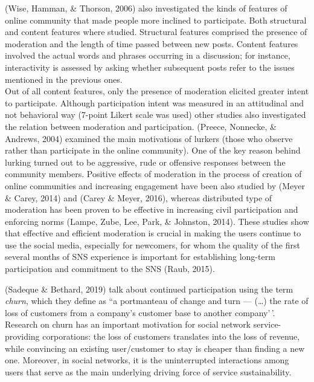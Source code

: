 \documentclass[
  10pt,
  dvipsnames]{scrartcl}
\begin{document}
(Wise, Hamman, \& Thorson, 2006) also investigated the kinds of features
of online community that made people more inclined to participate. Both
structural and content features where studied. Structural features
comprised the presence of moderation and the length of time passed
between new posts. Content features involved the actual words and
phrases occurring in a discussion; for instance, interactivity is
assessed by asking whether subsequent posts refer to the issues
mentioned in the previous ones.\\
Out of all content features, only the presence of moderation elicited
greater intent to participate. Although participation intent was
measured in an attitudinal and not behavioral way (7-point Likert scale
was used) other studies also investigated the relation between
moderation and participation. (Preece, Nonnecke, \& Andrews, 2004)
examined the main motivations of lurkers (those who observe rather than
participate in the online community). One of the key reason behind
lurking turned out to be aggressive, rude or offensive responses between
the community members. Positive effects of moderation in the process of
creation of online communities and increasing engagement have been also
studied by (Meyer \& Carey, 2014) and (Carey \& Meyer, 2016), whereas
distributed type of moderation has been proven to be effective in
increasing civil participation and enforcing norms (Lampe, Zube, Lee,
Park, \& Johnston, 2014). These studies show that effective and
efficient moderation is crucial in making the users continue to use the
social media, especially for newcomers, for whom the quality of the
first several months of SNS experience is important for establishing
long-term participation and commitment to the SNS (Raub, 2015).

(Sadeque \& Bethard, 2019) talk about continued participation using the
term \textit{churn}, which they define as ``a portmanteau of change and
turn --- (\dots) the rate of loss of customers from a company's customer
base to another company'\,'. Research on churn has an important
motivation for social network service-providing corporations: the loss
of customers translates into the loss of revenue, while convincing an
existing user/customer to stay is cheaper than finding a new one.
Moreover, in social networks, it is the uninterrupted interactions among
users that serve as the main underlying driving force of service
sustainability.
\end{document}
